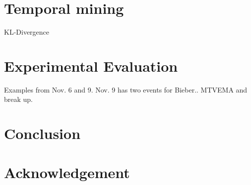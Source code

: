 \documentclass{sig-alternate}
\begin{document}
\section{Temporal mining}
KL-Divergence 

\section{Experimental Evaluation}
Examples from Nov. 6 and 9. Nov. 9 has two events for Bieber.. MTVEMA and break up.

\section{Conclusion}

\section{Acknowledgement}

%
%
%
%
\end{document}
